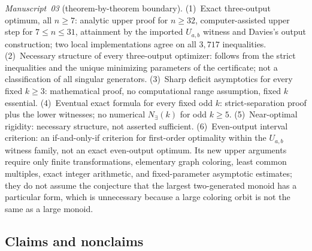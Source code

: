 \documentclass[11pt,a4paper]{article}
\numberwithin{equation}{section}
\theoremstyle{definition}
\theoremstyle{remark}
\begin{document}
\emph{Manuscript~03} (theorem-by-theorem boundary). (1)~Exact three-output
optimum, all $n\ge7$: analytic upper proof for $n\ge32$, computer-assisted
upper step for $7\le n\le31$, attainment by the imported $U_{a,b}$ witness and
Davies's output construction; two local implementations agree on all $3{,}717$
inequalities. (2)~Necessary structure of every three-output optimizer: follows
from the strict inequalities and the unique minimizing parameters of the
certificate; not a classification of all singular generators. (3)~Sharp
deficit asymptotics for every fixed $k\ge3$: mathematical proof, no
computational range assumption, fixed $k$ essential. (4)~Eventual exact
formula for every fixed odd $k$: strict-separation proof plus the lower
witnesses; no numerical $N_\exists(k)$ for odd $k\ge5$. (5)~Near-optimal
rigidity: necessary structure, not asserted sufficient. (6)~Even-output
interval criterion: an if-and-only-if criterion for first-order optimality
within the $U_{a,b}$ witness family, not an exact even-output optimum. Its
new upper arguments require only finite transformations, elementary graph
coloring, least common multiples, exact integer arithmetic, and fixed-parameter
asymptotic estimates; they do not assume the conjecture that the largest
two-generated monoid has a particular form, which is unnecessary because a
large coloring orbit is not the same as a large monoid.

\subsection{Claims and nonclaims}
\end{document}
